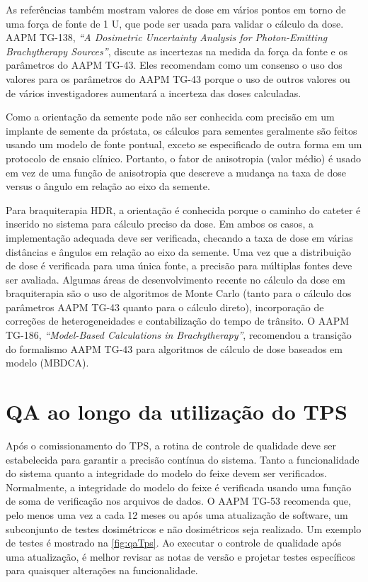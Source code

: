 \documentclass[11pt,a4paper]{article}
\newcounter{exemplo}
\begin{document}
	As referências também mostram valores de dose em vários pontos em torno de uma força de fonte de 1 U, que pode ser usada para validar o cálculo da dose. AAPM TG-138, \textit{``A Dosimetric Uncertainty Analysis for Photon-Emitting Brachytherapy Sources''}, discute as incertezas na medida da força da fonte e os parâmetros do AAPM TG-43. Eles recomendam como um consenso o uso dos valores para os parâmetros do AAPM TG-43 porque o uso de outros valores ou de vários investigadores aumentará a incerteza das doses calculadas.

	Como a orientação da semente pode não ser conhecida com precisão em um implante de semente da próstata, os cálculos para sementes geralmente são feitos usando um modelo de fonte pontual, exceto se especificado de outra forma em um protocolo de ensaio clínico. Portanto, o fator de anisotropia (valor médio) é usado em vez de uma função de anisotropia que descreve a mudança na taxa de dose versus o ângulo em relação ao eixo da semente.

	Para braquiterapia HDR, a orientação é conhecida porque o caminho do cateter é inserido no sistema para cálculo preciso da dose. Em ambos os casos, a implementação adequada deve ser verificada, checando a taxa de dose em várias distâncias e ângulos em relação ao eixo da semente. Uma vez que a distribuição de dose é verificada para uma única fonte, a precisão para múltiplas fontes deve ser avaliada. Algumas áreas de desenvolvimento recente no cálculo da dose em braquiterapia são o uso de algoritmos de Monte Carlo (tanto para o cálculo dos parâmetros AAPM TG-43 quanto para o cálculo direto), incorporação de correções de heterogeneidades e contabilização do tempo de trânsito. O AAPM TG-186, \textit{``Model-Based Calculations in Brachytherapy''}, recomendou a transição do formalismo AAPM TG-43 para algoritmos de cálculo de dose baseados em modelo (MBDCA).

\section{QA ao longo da utilização do TPS}

	Após o comissionamento do TPS, a rotina de controle de qualidade deve ser estabelecida para garantir a precisão contínua do sistema. Tanto a funcionalidade do sistema quanto a integridade do modelo do feixe devem ser verificados. Normalmente, a integridade do modelo do feixe é verificada usando uma função de soma de verificação nos arquivos de dados. O AAPM TG-53 recomenda que, pelo menos uma vez a cada 12 meses ou após uma atualização de software, um subconjunto de testes dosimétricos e não dosimétricos seja realizado. Um exemplo de testes é mostrado na \ref{fig:qaTps}. Ao executar o controle de qualidade após uma atualização, é melhor revisar as notas de versão e projetar testes específicos para quaisquer alterações na funcionalidade.
\end{document}
